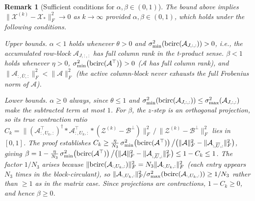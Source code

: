 \documentclass[11pt]{article}
\newtheorem{remark}[theorem]{Remark}
\def\fm#1{\mathcal{#1}}
\begin{document}
\begin{remark}[Sufficient conditions for $\alpha,\beta\in(0,1)$]
\label{rem:alpha-beta}
The bound above implies $\|\fm X^{(k)}-\fm X_\ast\|_F^2\to 0$ as $k\to\infty$
provided $\alpha,\beta\in(0,1)$, which holds under the following conditions.

\textit{Upper bounds.}
$\alpha<1$ holds whenever $\theta>0$ and
$\sigma_{\min}^2\!\left(\bcirc(\fm A_{J,:,:})\right)>0$, i.e., the accumulated
row-block $\fm A_{J,:,:}$ has full column rank in the t-product sense.
$\beta<1$ holds whenever $\eta>0$,
$\sigma_{\min}^2\!\left(\bcirc(\fm A^\top)\right)>0$ ($\fm A$ has full column rank),
and $\|\fm A_{:,\overline{U},:}\|_F^2<\|\fm A\|_F^2$ (the active column-block
never exhausts the full Frobenius norm of $\fm A$).

\textit{Lower bounds.}
$\alpha\geq 0$ always, since $\theta\leq 1$ and
$\sigma_{\min}^2\!\left(\bcirc(\fm A_{J,:,:})\right)\leq
\sigma_{\max}^2\!\left(\fm A_{J,:,:}\right)$ make the subtracted term at most $1$.
For $\beta$, the $z$-step is an orthogonal projection, so its true contraction
ratio $C_k = \|\left(\fm A_{:,U_k,:}^\top\right)^\dagger *\fm A_{:,U_k,:}^\top *
(\fm Z^{(k)}-\fm B^\perp)\|_F^2\,\big/\,\|\fm Z^{(k)}-\fm B^\perp\|_F^2$
lies in $[0,1]$.
The proof establishes
$C_k\geq\frac{\eta}{N_3}\,\sigma_{\min}^2\!\left(\bcirc(\fm A^\top)\right)\big/
\bigl(\|\fm A\|_F^2-\|\fm A_{:,\overline{U},:}\|_F^2\bigr)$,
giving $\beta = 1-\frac{\eta}{N_3}\,\sigma_{\min}^2\!\left(\bcirc(\fm A^\top)\right)\big/
\bigl(\|\fm A\|_F^2-\|\fm A_{:,\overline{U},:}\|_F^2\bigr)\leq 1-C_k\leq 1$.
The factor $1/N_3$ arises because $\|\bcirc(\fm A_{:,U_k,:})\|_F^2 = N_3\|\fm A_{:,U_k,:}\|_F^2$
(each entry appears $N_3$ times in the block-circulant), so
$\|\fm A_{:,U_k,:}\|_F^2/\sigma_{\max}^2(\bcirc(\fm A_{:,U_k,:}))\geq 1/N_3$
rather than $\geq 1$ as in the matrix case.
Since projections are contractions, $1-C_k\geq 0$, and hence $\beta\geq 0$.
\end{remark}
\end{document}
